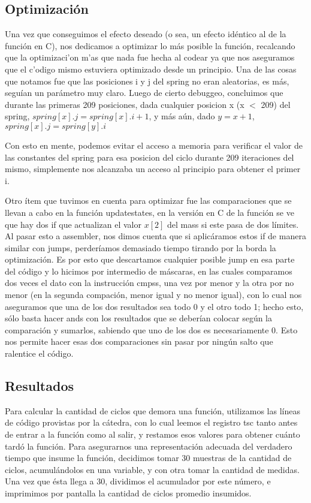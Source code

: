 \documentclass[a4paper,10pt]{article}
\begin{document}
\newpage

\subsection{Optimización}

Una vez que conseguimos el efecto deseado (o sea, un efecto idéntico al de la función en C), nos dedicamos a optimizar lo más posible la función, recalcando que la optimizaci'on m'as que nada fue hecha al codear ya que nos aseguramos que el c'odigo mismo estuviera optimizado desde un principio. Una de las cosas que notamos fue que las posiciones i y j del spring no eran aleatorias, es más, seguían un parámetro muy claro. Luego de cierto debuggeo, concluimos que durante las primeras 209 posiciones, dada cualquier posicion x (x $<$ 209) del spring, $spring[x].j = spring[x].i +1$, y más aún, dado $y = x+1$, $spring[x].j = spring[y].i$

Con esto en mente, podemos evitar el acceso a memoria para verificar el valor de las constantes del spring para esa posicion del ciclo durante 209 iteraciones del mismo, simplemente nos alcanzaba un acceso al principio para obtener el primer i. 

Otro ítem que tuvimos en cuenta para optimizar fue las comparaciones que se llevan a cabo en la función updatestates, en la versión en C de la función se ve que hay dos if que actualizan el valor $x[2]$ del mass si este pasa de dos límites. Al pasar esto a assembler, nos dimos cuenta que si aplicáramos estos if de manera similar con jumps, perderíamos demasiado tiempo tirando por la borda la optimización. Es por esto que descartamos cualquier posible jump en esa parte del código y lo hicimos por intermedio de máscaras, en las cuales comparamos dos veces el dato con la instrucción cmpss, una vez por menor y la otra por no menor (en la segunda compación, menor igual y no menor igual), con lo cual nos aseguramos que una de los dos resultados sea todo 0 y el otro todo 1; hecho esto, sólo basta hacer ands con los resultados que se deberían colocar según la comparación y sumarlos, sabiendo que uno de los dos es necesariamente 0. Esto nos permite hacer esas dos comparaciones sin pasar por ningún salto que ralentice el código.

\subsection{Resultados}

Para calcular la cantidad de ciclos que demora una función, utilizamos las líneas de código provistas por la cátedra, con lo cual leemos el registro tsc tanto antes de entrar a la función como al salir, y restamos esos valores para obtener cuánto tardó la función. Para asegurarnos una representación adecuada del verdadero tiempo que insume la función, decidimos tomar 30 muestras de la cantidad de ciclos, acumulándolos en una variable, y con otra tomar la cantidad de medidas. Una vez que ésta llega a 30, dividimos el acumulador por este número, e imprimimos por pantalla la cantidad de ciclos promedio insumidos.
\end{document}
